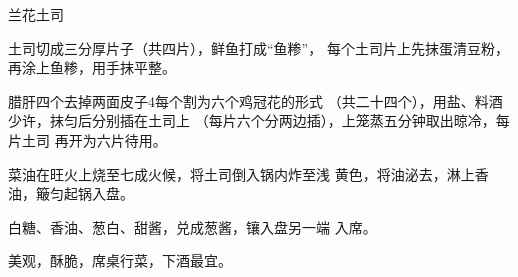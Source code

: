 \begin{recipe}{兰花土司}

\ingredients


\cooking

土司切成三分厚片子（共四片），鲜鱼打成“鱼糁”， 每个土司片上先抹蛋清豆粉，再涂上鱼糁，用手抹平整。

\step 腊肝四个去掉两面皮子4每个割为六个鸡冠花的形式 （共二十四个），用盐、料酒少许，抹匀后分别插在土司上 （每片六个分两边插），上笼蒸五分钟取出晾冷，每片土司 再开为六片待用。

菜油在旺火上烧至七成火候，将土司倒入锅内炸至浅 黄色，将油泌去，淋上香油，簸匀起锅入盘。

\step 白糖、香油、葱白、甜酱，兑成葱酱，镶入盘另一端 入席。

\notes

美观，酥脆，席桌行菜，下酒最宜。

\end{recipe}

